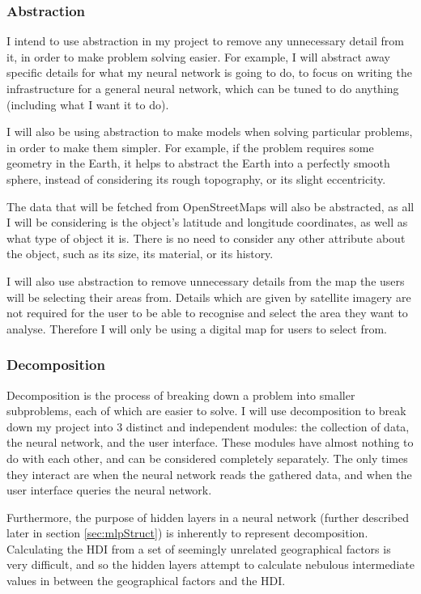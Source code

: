 \documentclass[12pt]{report}
\begin{document}
\subsubsection{Abstraction}
I intend to use abstraction in my project to remove any unnecessary detail from it, in order to make problem solving easier. For example, I will abstract away specific details for what my neural network is going to do, to focus on writing the infrastructure for a general neural network, which can be tuned to do anything (including what I want it to do).

I will also be using abstraction to make models when solving particular problems, in order to make them simpler. For example, if the problem requires some geometry in the Earth, it helps to abstract the Earth into a perfectly smooth sphere, instead of considering its rough topography, or its slight eccentricity.

The data that will be fetched from OpenStreetMaps will also be abstracted, as all I will be considering is the object's latitude and longitude coordinates, as well as what type of object it is. There is no need to consider any other attribute about the object, such as its size, its material, or its history.

I will also use abstraction to remove unnecessary details from the map the users will be selecting their areas from. Details which are given by satellite imagery are not required for the user to be able to recognise and select the area they want to analyse. Therefore I will only be using a digital map for users to select from.

\subsubsection{Decomposition}
Decomposition is the process of breaking down a problem into smaller subproblems, each of which are easier to solve. I will use decomposition to break down my project into 3 distinct and independent modules: the collection of data, the neural network, and the user interface. These modules have almost nothing to do with each other, and can be considered completely separately. The only times they interact are when the neural network reads the gathered data, and when the user interface queries the neural network.

Furthermore, the purpose of hidden layers in a neural network (further described later in section \ref{sec:mlpStruct}) is inherently to represent decomposition. Calculating the HDI from a set of seemingly unrelated geographical factors is very difficult, and so the hidden layers attempt to calculate nebulous intermediate values in between the geographical factors and the HDI.
\end{document}
